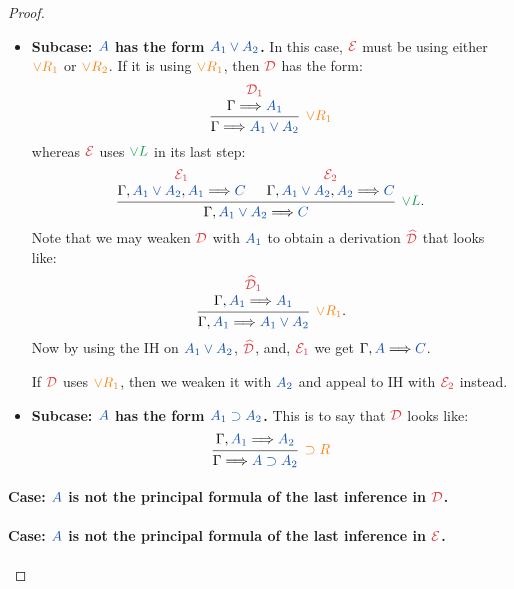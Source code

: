\begin{proof}
\begin{itemize}
    \item \textbf{Subcase: $\prp{A}$ has the form $\prp{A_1 \lor A_2}$.}
    In this case, $\drv{E}$ must be using either $\rightRule{\lor R_1}$
    or $\rightRule{\lor R_2}$. If it is using $\rightRule{\lor R_1}$, then
    $\drv{D}$ has the form:
    \[
      \begin{prooftree}
        \hypo{\drv{D}[1]}
        \infer[no rule]1{\sequent{A_1}}
        \infer1[$\rightRule{\lor R_1}$]{\sequent{A_1 \lor A_2}}
      \end{prooftree}
    \]
    whereas $\drv{E}$ uses $\leftRule{\lor L}$ in its last step:
    \[
      \begin{prooftree}
        \hypo{\drv{E}[1]}
        \infer[no rule]1{\sequent[A_1 \lor A_2][A_1]{C}}
        \hypo{\drv{E}[2]}
        \infer[no rule]1{\sequent[A_1 \lor A_2][A_2]{C}}
        \infer2[$\leftRule{\lor L}$.]{\sequent[A_1 \lor A_2]{C}}
      \end{prooftree}
    \]
    Note that we may weaken $\drv{D}$ with $\prp{A_1}$ to obtain a derivation
    $\drv{\widehat{D}}$ that looks like:
    \[
      \begin{prooftree}
        \hypo{\drv{\widehat{D}}[1]}
        \infer[no rule]1{\sequent[A_1]{A_1}}
        \infer1[$\rightRule{\lor R_1}$.]{\sequent[A_1]{A_1 \lor A_2}}
      \end{prooftree}
    \]
    Now by using the IH on $\prp{A_1 \lor A_2}$, $\drv{\widehat{D}}$, and,
    $\drv{E}[1]$ we get $\sequent[A]{C}$.

    If $\drv{D}$ uses $\rightRule{\lor R_1}$, then we weaken it with
    $\prp{A_2}$ and appeal to IH with $\drv{E}[2]$ instead.

    \item \textbf{Subcase: $\prp{A}$ has the form $\prp{A_1 \supset A_2}$.}
    This is to say that $\drv{D}$ looks like:
    \[
      \begin{prooftree}
        \hypo{\sequent[A_1]{A_2}}
        \infer1[$\rightRule{\supset R}$]{\sequent{A \supset A_2}}
      \end{prooftree}
    \]
  \end{itemize}

  \paragraph{Case: $\prp{A}$ is not the principal formula of the last
  inference in $\drv{D}$.}\quad

  \paragraph{Case: $\prp{A}$ is not the principal formula of the last
  inference in $\drv{E}$.}\quad

\end{proof}




